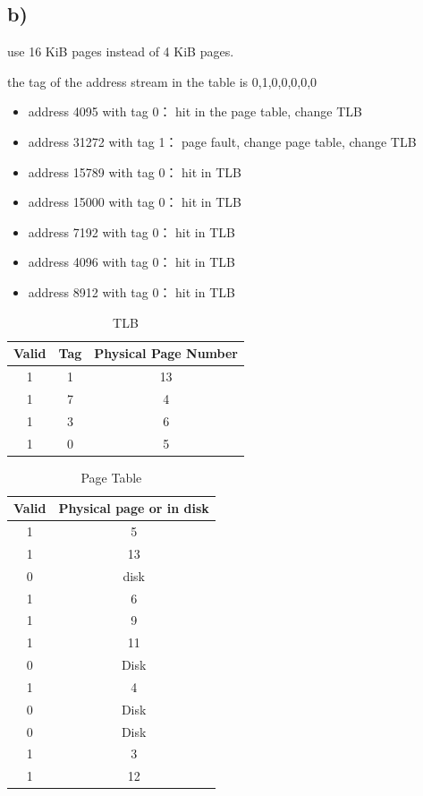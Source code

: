 \documentclass[cn,12pt]{homework}
\begin{document}
\begin{solution}
\subsection*{b)}

use 16 KiB pages instead of 4 KiB pages.

the tag of the address stream in the table is 0,1,0,0,0,0,0

\begin{itemize}
  \item address 4095 with tag 0： hit in the page table, change TLB 
  \item address 31272 with tag 1： page fault, change page table, change TLB
  \item address 15789 with tag 0： hit in TLB
  \item address 15000 with tag 0： hit in TLB
  \item address 7192 with tag 0： hit in TLB
  \item address 4096 with tag 0： hit in TLB
  \item address 8912 with tag 0： hit in TLB
\end{itemize}

\begin{table}[H]
\centering
\caption{TLB}
\begin{tabular}{|c|c|c|}
\hline
Valid & Tag & Physical Page Number \\ \hline
1 & 1 & 13 \\ \hline
1 & 7 & 4 \\ \hline
1 & 3 & 6 \\ \hline
1 & 0 & 5 \\ \hline
\end{tabular}
\end{table}

\begin{table}[H]
\centering
\caption{Page Table}
\begin{tabular}{|c|c|}
\hline
Valid & Physical page or in disk \\ \hline
1 & 5 \\ \hline
1 & 13 \\ \hline
0 & disk \\ \hline
1 & 6 \\ \hline
1 & 9 \\ \hline
1 & 11 \\ \hline
0 & Disk \\ \hline
1 & 4 \\ \hline
0 & Disk \\ \hline
0 & Disk \\ \hline
1 & 3 \\ \hline
1 & 12 \\ \hline
\end{tabular}
\end{table}


\end{solution}
\end{document}
